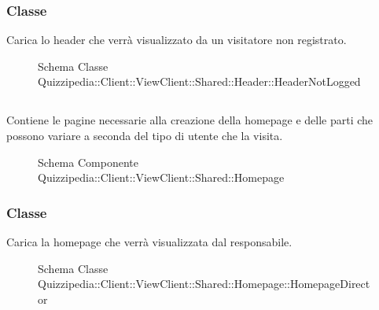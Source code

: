 \subsubsection{Classe }
Carica lo header che verrà visualizzato da un visitatore non registrato.
\begin{figure}[H]
\centering
\noindent{}
\caption[Schema Classe HeaderNotLogged]{Schema Classe Quizzipedia::Client::ViewClient::Shared::Header::HeaderNotLogged}
\end{figure}
\subsection{}
Contiene le pagine necessarie alla creazione della homepage e delle parti che possono variare a seconda del tipo di utente che la visita.
\begin{figure}[H]
\centering
\noindent{}
\caption[Schema Componente Quizzipedia::Client::ViewClient::Shared::Homepage]{Schema Componente Quizzipedia::Client::ViewClient::Shared::Homepage}
\end{figure}
\subsubsection{Classe }
Carica la homepage che verrà visualizzata dal responsabile.
\begin{figure}[H]
\centering
\noindent{}
\caption[Schema Classe HomepageDirector]{Schema Classe Quizzipedia::Client::ViewClient::Shared::Homepage::HomepageDirector}
\end{figure}
